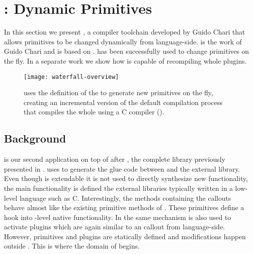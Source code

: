 \section{\WF: Dynamic Primitives}



\noindent In this section we present \WF, a compiler toolchain developed by Guido Chari that allows primitives to be changed dynamically from language-side.
\WF is the work of Guido Chari and is based on \B.
\WF has been successfully used to change \PH primitives on the fly.
In a separate work \cite{Char13a} we show how \WF is capable of recompiling whole \VM plugins.

\begin{figure}[h]
	\centering
	\texttt{[image: waterfall-overview]}
	\caption[\WF Overview]{
	\WF uses the \Slang definition of the \VM to generate new primitives on the fly, creating an incremental version of the default \VM compilation process that compiles the whole \VM using a C compiler (\GCC). }
\end{figure}

\subsection{Background}

\WF is our second application on top of \B after \NB, the complete \FFI library previously presented in .
\NB uses \B to generate the glue code between \PH and the external library.
Even though \NB is extendable it is not used to directly synthesize new functionality, the main functionality is defined the external libraries typically written in a low-level language such as C.
Interestingly, the \NB methods containing the callouts behave almost like the existing primitive methods of \PH.
These primitives define a hook into \VM-level native functionality.
In \PH the same mechanism is also used to activate plugins which are again similar to an \FFI callout from language-side.
However, primitives and plugins are statically defined and modifications happen outside \PH.
This is where the domain of \WF begins.

